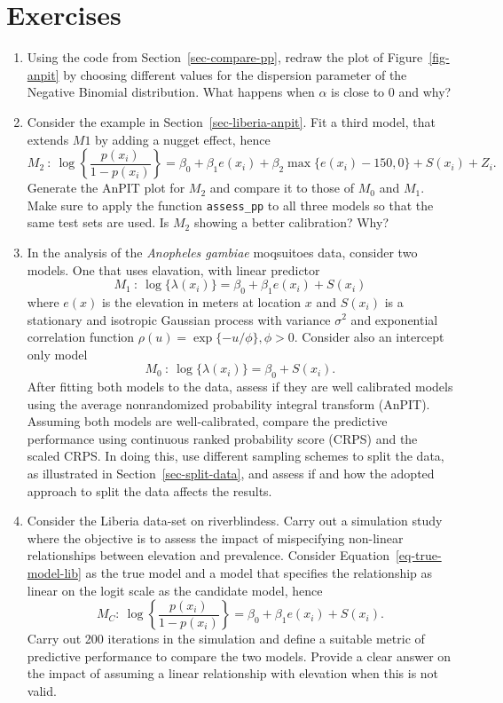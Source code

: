 \documentclass[
  letterpaper,
]{krantz}
\begin{document}
\section{Exercises}\label{exercises-2}

\begin{enumerate}
\def\labelenumi{\arabic{enumi}.}
\item
  Using the code from Section~\ref{sec-compare-pp}, redraw the plot of
  Figure~\ref{fig-anpit} by choosing different values for the dispersion
  parameter of the Negative Binomial distribution. What happens when
  \(\alpha\) is close to 0 and why?
\item
  Consider the example in Section~\ref{sec-liberia-anpit}. Fit a third
  model, that extends \(M1\) by adding a nugget effect, hence \[
  M_{2} \: : \: \log\left\{\frac{p(x_i)}{1-p(x_i)}\right\} = \beta_0 + \beta_{1}e(x_i) + \beta_{2}\max\{e(x_i) - 150, 0\} + S(x_i) + Z_i.
  \] Generate the AnPIT plot for \(M_2\) and compare it to those of
  \(M_0\) and \(M_1\). Make sure to apply the function
  \texttt{assess\_pp} to all three models so that the same test sets are
  used. Is \(M_2\) showing a better calibration? Why?
\item
  In the analysis of the \emph{Anopheles gambiae} moqsuitoes data,
  consider two models. One that uses elavation, with linear predictor \[
  M_1\: : \: \log\{\lambda(x_i)\} = \beta_0 + \beta_1 e(x_i) + S(x_i)
  \] where \(e(x)\) is the elevation in meters at location \(x\) and
  \(S(x_i)\) is a stationary and isotropic Gaussian process with
  variance \(\sigma^2\) and exponential correlation function
  \(\rho(u) = \exp\{-u/\phi\}, \phi>0\). Consider also an intercept only
  model \[
  M_0\: : \: \log\{\lambda(x_i)\} = \beta_0 +  S(x_i).
  \] After fitting both models to the data, assess if they are well
  calibrated models using the average nonrandomized probability integral
  transform (AnPIT). Assuming both models are well-calibrated, compare
  the predictive performance using continuous ranked probability score
  (CRPS) and the scaled CRPS. In doing this, use different sampling
  schemes to split the data, as illustrated in
  Section~\ref{sec-split-data}, and assess if and how the adopted
  approach to split the data affects the results.
\item
  Consider the Liberia data-set on riverblindess. Carry out a simulation
  study where the objective is to assess the impact of mispecifying
  non-linear relationships between elevation and prevalence. Consider
  Equation~\ref{eq-true-model-lib} as the true model and a model that
  specifies the relationship as linear on the logit scale as the
  candidate model, hence \[M_{C}: \:
  \log\left\{\frac{p(x_i)}{1-p(x_i)}\right\} = \beta_{0} + \beta_{1}e(x_i) + S(x_i).
  \] Carry out 200 iterations in the simulation and define a suitable
  metric of predictive performance to compare the two models. Provide a
  clear answer on the impact of assuming a linear relationship with
  elevation when this is not valid.
\end{enumerate}
\end{document}
